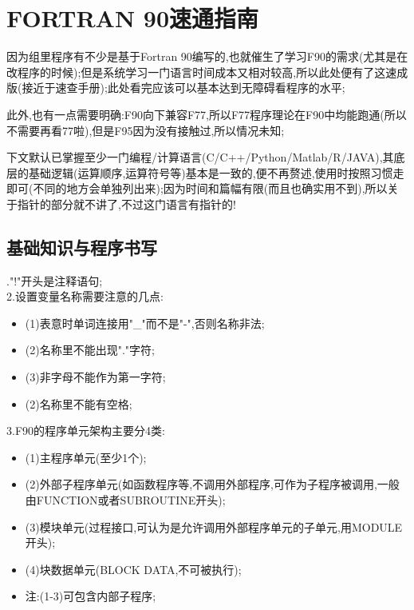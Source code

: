 \chapter{FORTRAN 90速通指南}

因为组里程序有不少是基于Fortran 90编写的,也就催生了学习F90的需求(尤其是在改程序的时候);但是系统学习一门语言时间成本又相对较高,所以此处便有了这速成版(接近于速查手册);此处看完应该可以基本达到无障碍看程序的水平;\par

此外,也有一点需要明确:F90向下兼容F77,所以F77程序理论在F90中均能跑通(所以不需要再看77啦),但是F95因为没有接触过,所以情况未知;\par

下文默认已掌握至少一门编程/计算语言(C/C++/Python/Matlab/R/JAVA),其底层的基础逻辑(运算顺序,运算符号等)基本是一致的,便不再赘述,使用时按照习惯走即可(不同的地方会单独列出来);因为时间和篇幅有限(而且也确实用不到),所以关于指针的部分就不讲了,不过这门语言有指针的!



\section{基础知识与程序书写}
."!"开头是注释语句;\\
2.设置变量名称需要注意的几点:
\begin{itemize}
	\item{(1)表意时单词连接用"\_"而不是"-",否则名称非法;}
	\item{(2)名称里不能出现"."字符;}
	\item{(3)非字母不能作为第一字符;}
	\item{(2)名称里不能有空格;}
\end{itemize}

\noindent
3.F90的程序单元架构主要分4类:
\begin{itemize}
	\item{(1)主程序单元(至少1个);}
	\item{(2)外部子程序单元(如函数程序等,不调用外部程序,可作为子程序被调用,一般由FUNCTION或者SUBROUTINE开头);}
	\item{(3)模块单元(过程接口,可认为是允许调用外部程序单元的子单元,用MODULE开头);}
	\item{(4)块数据单元(BLOCK DATA,不可被执行);}
	\item{注:(1-3)可包含内部子程序;}
\end{itemize}


